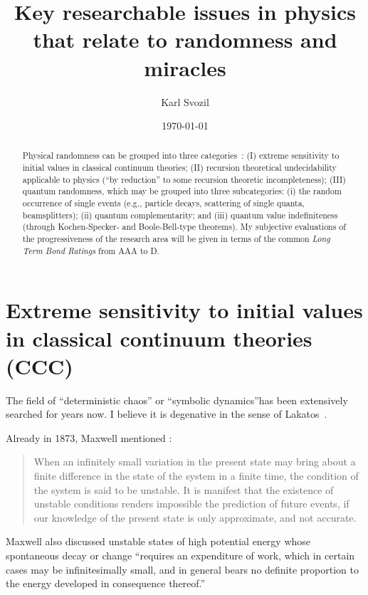 \documentclass[%
 reprint,
 showpacs,
 showkeys,
 preprintnumbers,
 amsmath,amssymb,
 aps,
 prl,
  longbibliography,
 ]{revtex4-1}
\begin{document}
\title{Key researchable issues in physics that relate to randomness and miracles}


\author{Karl Svozil}
 


\date{\today}

\begin{abstract}
Physical randomness can be grouped into three categories~\cite{svozil-07-physical_unknowables}:
(I) extreme sensitivity to initial values in classical continuum theories;
(II) recursion theoretical undecidability applicable to physics (``by reduction'' to some recursion theoretic incompleteness);
(III) quantum randomness, which may be grouped into three subcategories:
(i) the random occurrence of single events (e.g., particle decays, scattering of single quanta, beamsplitters);
(ii) quantum complementarity; and
(iii) quantum value indefiniteness (through Kochen-Specker- and Boole-Bell-type theorems).
My subjective evaluations of the progressiveness of the research area will be given in terms of the common {\em Long Term Bond Ratings} from AAA to D.
\end{abstract}

\maketitle




\section{Extreme sensitivity to initial values in classical continuum theories (CCC)}

The field of ``deterministic chaos'' or ``symbolic dynamics''has been extensively searched for years now.
I believe it is degenative in the sense of Lakatos~\cite{lakatosch}.


Already in 1873, Maxwell mentioned \cite[211-212]{Campbell-1882}:
\begin{quote}
{
When an infinitely small variation in the present state may bring about a finite difference in the state of the
system in a finite time, the condition of the system is said to be unstable.
It is manifest that the existence of unstable conditions renders impossible the prediction of future events, if our
knowledge of the present state is only approximate, and not accurate.
}
\end{quote}
Maxwell also discussed unstable states of high potential energy whose
spontaneous \citep{frank}  decay or change \cite[212]{Campbell-1882}
{``requires an expenditure of work, which in certain cases may be
infinitesimally small, and in general bears no definite proportion to the energy developed in consequence thereof.''}
\end{document}

